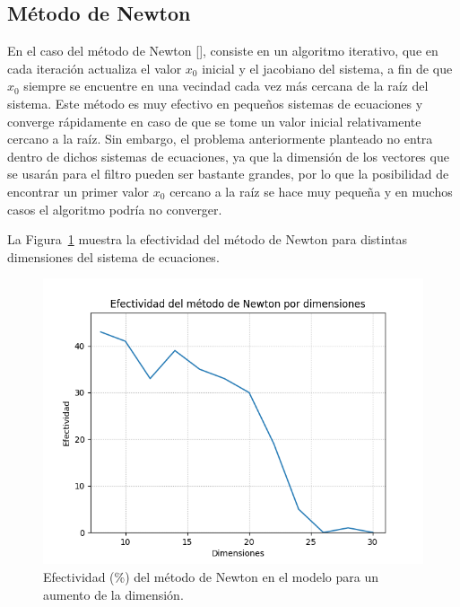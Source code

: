 \subsection{M\'etodo de Newton}

\par En el caso del m\'etodo de Newton [\cite{23}], consiste en un algoritmo iterativo, que en cada iteraci\'on actualiza el valor $x_0$ inicial y el jacobiano del sistema, a fin de que $x_0$ siempre se encuentre en una vecindad cada vez m\'as cercana de la ra\'iz del sistema. Este m\'etodo es muy efectivo en peque\~nos sistemas de ecuaciones y converge r\'apidamente en caso de que se tome un valor inicial relativamente cercano a la ra\'iz. Sin embargo, el problema anteriormente planteado no entra dentro de dichos sistemas de ecuaciones, ya que la dimensi\'on de los vectores que se usar\'an para el filtro pueden ser bastante grandes, por lo que la posibilidad de encontrar un primer valor $x_0$ cercano a la ra\'iz se hace muy peque\~na y en muchos casos el algoritmo podr\'ia no converger.\\

\par La Figura~\ref{Newton} muestra la efectividad del m\'etodo de Newton para distintas dimensiones del sistema de ecuaciones.

\begin{figure}[h]
\center
\includegraphics[scale=.45]{Graphics/Newton.png}
\caption{Efectividad (\%) del m\'etodo de Newton en el modelo para un aumento de la dimensi\'on.}
\label{Newton}
\end{figure}

